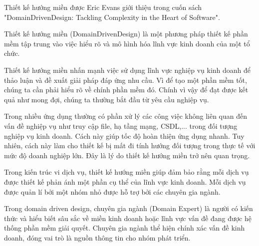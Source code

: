 Thiết kế hướng miền được Eric Evans giới thiệu trong cuốn sách "DomainDrivenDesign: Tackling Complexity in the Heart of Software".

Thiết kế hướng miền (DomainDrivenDesign) là một phương pháp thiết kế phần mềm tập trung vào việc hiểu rõ và mô hình hóa lĩnh vực kinh doanh của một tổ chức.

Thiết kế hướng miền nhấn mạnh việc sử dụng lĩnh vực nghiệp vụ kinh doanh để thảo luận và đề xuất giải pháp đáp ứng nhu cầu. Vì để tạo một phần mềm tốt, chúng ta cần phải hiểu rõ về chính phần mềm đó. Chính vì vậy để đạt được kết quả như mong đợi, chúng ta thường bắt đầu từ yêu cầu nghiệp vụ.

Trong nhiều ứng dụng thường có phần xử lý các công việc không liên quan đến vấn đề nghiệp vụ như truy cập file, hạ tầng mạng, CSDL,... trong đối tượng nghiệp vụ kinh doanh. Cách này giúp tốc độ hoàn thiện ứng dụng nhanh. Tuy nhiên, cách này làm cho thiết kế bị mất đi tính hướng đối tượng trong thực tế với mức độ doanh nghiệp lớn. Đây là lý do thiết kế hướng miền trở nên quan trọng.

Trong kiến trúc vi dịch vụ, thiết kế hướng miền giúp đảm bảo rằng mỗi dịch vụ được thiết kế phản ánh một phần cụ thể của lĩnh vực kinh doanh. Mỗi dịch vụ được quản lí bởi một nhóm nhỏ được hỗ trợ bởi các chuyên gia ngành.


Trong domain driven design,  chuyên gia ngành (Domain Expert) là người có kiến thức và hiểu biết sâu sắc về miền kinh doanh hoặc lĩnh vực vấn đề đang được hệ thống phần mềm giải quyết.   Chuyên gia ngành thể hiện chính xác vấn đề kinh doanh, đóng vai trò là nguồn thông tin cho nhóm phát triển.

